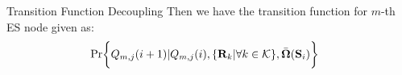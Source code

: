 \documentclass[10pt, conference, letterpaper]{IEEEtran}
\newcommand{\mat}{\mathbf}
\DeclarePairedDelimiter{\set}{\{}{\}}
\DeclarePairedDelimiter{\Brace}{\bigg\{}{\bigg\}}
\newcommand{\apSet}{\mathcal{K}}
\newcommand{\Stat}{\mathbf{S}}
\newcommand{\Policy}{\boldsymbol{\Omega}}
\newcommand{\BPolicy}{\bar{\Policy}}
\begin{document}
\begin{section}{Transition Function Decoupling}
        Then we have the transition function for $m$-th ES node given as:
        \begin{align*}
            & \Pr\Brace{Q_{m,j}(i+1)|Q_{m,j}(i), \set{\mat{R}_{k}|\forall k\in\apSet}, \BPolicy(\Stat_i)}
        \end{align*}
    \end{section}
    
    
    
\end{document}
